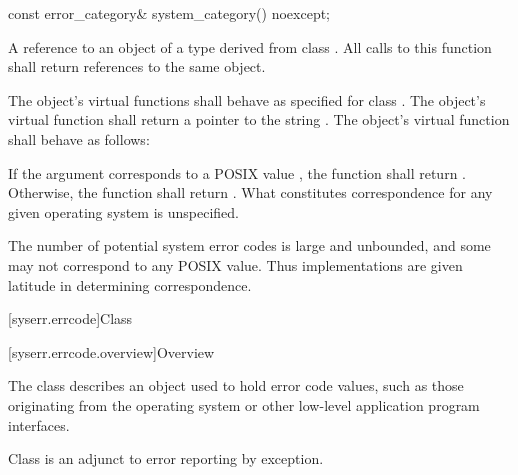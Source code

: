 %
\begin{itemdecl}
const error_category& system_category() noexcept;
\end{itemdecl}

\begin{itemdescr}
\pnum
\returns
A reference to an object of a type derived from class .
All calls to this function shall return references to the same object.

\pnum
\remarks
The object's  virtual functions shall behave as specified for
class . The object's  virtual function shall return a
pointer to the string . The object's 
virtual function shall behave as follows:

If the argument  corresponds to a POSIX  value , the
function shall return .
Otherwise, the function shall return . What constitutes correspondence for any given operating
system is unspecified.
\begin{note}
The number of potential system error codes is large
and unbounded, and some may not correspond to any POSIX  value. Thus
implementations are given latitude in determining correspondence.
\end{note}
\end{itemdescr}

[syserr.errcode]{Class }

[syserr.errcode.overview]{Overview}

\pnum
The class  describes an object used to hold error code
values, such as those originating from the operating system or other low-level
application program interfaces.
\begin{note}
Class  is an
adjunct to error reporting by exception.
\end{note}

